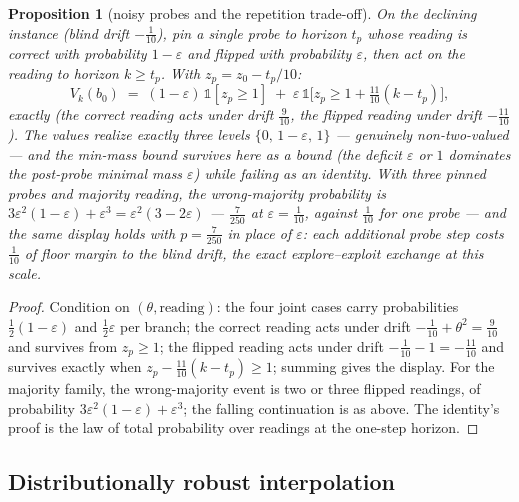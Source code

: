 \documentclass[10pt,twocolumn]{article}
\theoremstyle{plain}
\newtheorem{proposition}[theorem]{Proposition}
\theoremstyle{definition}
\theoremstyle{remark}
\begin{document}
\begin{proposition}[noisy probes and the repetition trade-off]\label{prop:noisyprobe}
On the declining instance (blind drift \(-\tfrac1{10}\)), pin a single
probe to horizon \(t_{p}\) whose reading is correct with probability
\(1 - \varepsilon\) and flipped with probability \(\varepsilon\),
then act on the reading to horizon \(k \ge t_{p}\). With
\(z_{p} = z_{0} - t_{p}/10\):
\[
V_{k}(b_{0}) \;=\; (1 - \varepsilon)\,\mathbb{1}[z_{p} \ge 1]
\;+\; \varepsilon\,\mathbb{1}\bigl[z_{p} \ge 1 + \tfrac{11}{10}(k - t_{p})\bigr],
\]
exactly (the correct reading acts under drift \(\tfrac9{10}\), the
flipped reading under drift \(-\tfrac{11}{10}\)). The values realize
exactly three levels \(\{0,\, 1 - \varepsilon,\, 1\}\) ---
genuinely non-two-valued --- and the min-mass bound survives here as a
bound (the deficit \(\varepsilon\) or \(1\) dominates the
post-probe minimal mass \(\varepsilon\)) while failing as an
identity. With three pinned probes and majority reading, the
wrong-majority probability is
\(3\varepsilon^{2}(1 - \varepsilon) + \varepsilon^{3} = \varepsilon^{2}(3 - 2\varepsilon)\)
--- \(\tfrac{7}{250}\) at \(\varepsilon = \tfrac1{10}\), against
\(\tfrac1{10}\) for one probe --- and the same display holds with
\(p = \tfrac{7}{250}\) in place of \(\varepsilon\): each
additional probe step costs \(\tfrac1{10}\) of floor margin to the
blind drift, the exact explore--exploit exchange at this scale.
\end{proposition}

\begin{proof}
Condition on \((\theta, \text{reading})\): the four joint cases carry
probabilities \(\tfrac12(1-\varepsilon)\) and \(\tfrac12\varepsilon\)
per branch; the correct reading acts under drift
\(-\tfrac1{10} + \theta^{2} = \tfrac9{10}\) and survives from
\(z_{p} \ge 1\); the flipped reading acts under drift
\(-\tfrac1{10} - 1 = -\tfrac{11}{10}\) and survives exactly when
\(z_{p} - \tfrac{11}{10}(k - t_{p}) \ge 1\); summing gives the
display. For the majority family, the wrong-majority event is two or
three flipped readings, of probability
\(3\varepsilon^{2}(1-\varepsilon) + \varepsilon^{3}\); the falling
continuation is as above. The identity's proof is the law of total
probability over readings at the one-step horizon.
\end{proof}

\subsection{Distributionally robust interpolation}\label{dr}
\end{document}
